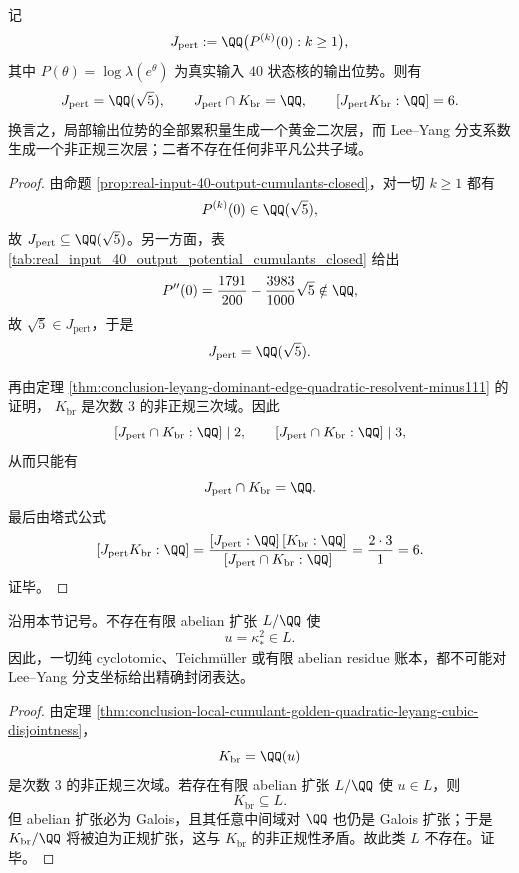 \begin{theorem}\label{thm:conclusion-local-cumulant-golden-quadratic-leyang-cubic-disjointness}
记
\[
J_{\mathrm{pert}}
:=
\QQ\bigl(P^{(k)}(0):k\ge 1\bigr),
\]
其中 \(P(\theta)=\log\lambda(e^\theta)\) 为真实输入 \(40\) 状态核的输出位势。则有
\[
J_{\mathrm{pert}}=\QQ(\sqrt5),
\qquad
J_{\mathrm{pert}}\cap K_{\mathrm{br}}=\QQ,
\qquad
[J_{\mathrm{pert}}K_{\mathrm{br}}:\QQ]=6.
\]
换言之，局部输出位势的全部累积量生成一个黄金二次层，而 Lee--Yang 分支系数生成一个非正规三次层；二者不存在任何非平凡公共子域。
\end{theorem}
\begin{proof}
由命题 \ref{prop:real-input-40-output-cumulants-closed}，对一切 \(k\ge 1\) 都有
\[
P^{(k)}(0)\in \QQ(\sqrt5),
\]
故 \(J_{\mathrm{pert}}\subseteq \QQ(\sqrt5)\)。另一方面，表
\ref{tab:real_input_40_output_potential_cumulants_closed} 给出
\[
P''(0)=\frac{1791}{200}-\frac{3983}{1000}\sqrt5\notin \QQ,
\]
故 \(\sqrt5\in J_{\mathrm{pert}}\)，于是
\[
J_{\mathrm{pert}}=\QQ(\sqrt5).
\]

再由定理 \ref{thm:conclusion-leyang-dominant-edge-quadratic-resolvent-minus111} 的证明，
\(
K_{\mathrm{br}}
\)
是次数 \(3\) 的非正规三次域。因此
\[
[J_{\mathrm{pert}}\cap K_{\mathrm{br}}:\QQ]
\mid 2,
\qquad
[J_{\mathrm{pert}}\cap K_{\mathrm{br}}:\QQ]
\mid 3,
\]
从而只能有
\[
J_{\mathrm{pert}}\cap K_{\mathrm{br}}=\QQ.
\]
最后由塔式公式
\[
[J_{\mathrm{pert}}K_{\mathrm{br}}:\QQ]
=
\frac{[J_{\mathrm{pert}}:\QQ]\,[K_{\mathrm{br}}:\QQ]}
{[J_{\mathrm{pert}}\cap K_{\mathrm{br}}:\QQ]}
=
\frac{2\cdot 3}{1}
=6.
\]
证毕。
\end{proof}

\begin{corollary}\label{cor:conclusion-leyang-branch-coordinate-no-finite-abelian-ledger}
沿用本节记号。不存在有限 abelian 扩张 \(L/\QQ\) 使
\[
u=\kappa_*^2\in L.
\]
因此，一切纯 cyclotomic、Teichm\"uller 或有限 abelian residue 账本，都不可能对 Lee--Yang 分支坐标给出精确封闭表达。
\end{corollary}
\begin{proof}
由定理 \ref{thm:conclusion-local-cumulant-golden-quadratic-leyang-cubic-disjointness}，
\[
K_{\mathrm{br}}=\QQ(u)
\]
是次数 \(3\) 的非正规三次域。若存在有限 abelian 扩张 \(L/\QQ\) 使 \(u\in L\)，则
\[
K_{\mathrm{br}}\subseteq L.
\]
但 abelian 扩张必为 Galois，且其任意中间域对 \(\QQ\) 也仍是 Galois 扩张；于是 \(K_{\mathrm{br}}/\QQ\) 将被迫为正规扩张，这与 \(K_{\mathrm{br}}\) 的非正规性矛盾。故此类 \(L\) 不存在。证毕。
\end{proof}

